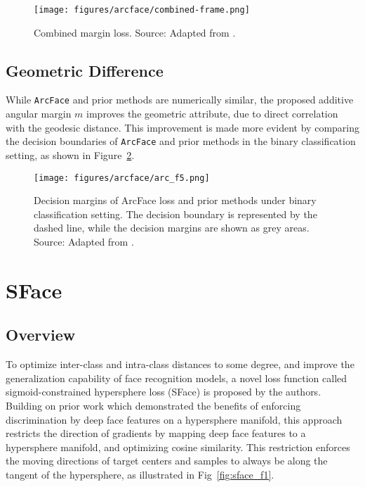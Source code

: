 \documentclass[10pt,a4paper,twoside]{article}
\begin{document}
\begin{figure}[h]
    \centering
    \texttt{[image: figures/arcface/combined-frame.png]} 
    \caption{Combined margin loss. Source: Adapted from \cite{arcface}.}
    \label{fig:combined_margin}
\end{figure}


\subsection{Geometric Difference}

While \texttt{ArcFace} and prior methods are numerically similar, the proposed additive angular margin \(m\) improves the geometric attribute, due to direct correlation with the geodesic distance\cite{wiki:geodesic}. This improvement is made more evident by comparing the decision boundaries of \texttt{ArcFace} and prior methods in the binary classification setting, as shown in Figure~\ref{fig:arc_f5}.


\begin{figure}[h]
    \centering
    \texttt{[image: figures/arcface/arc\_f5.png]} 
    \caption{Decision margins of ArcFace loss and prior methods under binary classification setting. The decision boundary is represented by the dashed line, while the decision margins are shown as grey areas. Source: Adapted from \cite{arcface}.}
    \label{fig:arc_f5}
\end{figure}


\section{SFace}

\subsection{Overview}

To optimize inter-class and intra-class distances to some degree, and improve the generalization capability of face recognition models, a novel loss function called sigmoid-constrained hypersphere loss (SFace\cite{sface}) is proposed by the authors. Building on prior work \cite{arcface, liu2017sphereface, wang2018cosface} which demonstrated the benefits of enforcing discrimination by deep face features on a hypersphere manifold, this approach restricts the direction of gradients by mapping deep face features to a hypersphere manifold, and optimizing cosine similarity. This restriction enforces the moving directions of target centers and samples to always be along the tangent of the hypersphere, as illustrated in Fig~\ref{fig:sface_f1}.
\end{document}
